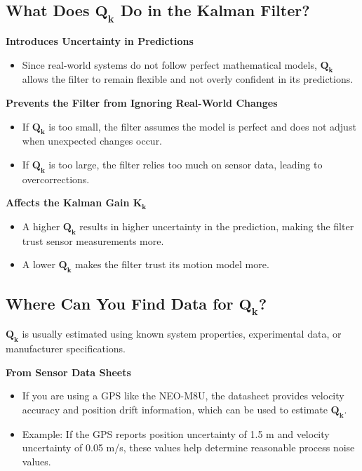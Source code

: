 \documentclass{article}
\begin{document}
\subsection*{What Does \(\mathbf{Q_k}\) Do in the Kalman Filter?}
\textbf{Introduces Uncertainty in Predictions}
\begin{itemize}
    \item Since real-world systems do not follow perfect mathematical models, \(\mathbf{Q_k}\) allows the filter to remain flexible and not overly confident in its predictions.
\end{itemize}

\textbf{Prevents the Filter from Ignoring Real-World Changes}
\begin{itemize}
    \item If \(\mathbf{Q_k}\) is too small, the filter assumes the model is perfect and does not adjust when unexpected changes occur.
    \item If \(\mathbf{Q_k}\) is too large, the filter relies too much on sensor data, leading to overcorrections.
\end{itemize}

\textbf{Affects the Kalman Gain \(\mathbf{K_k}\)}
\begin{itemize}
    \item A higher \(\mathbf{Q_k}\) results in higher uncertainty in the prediction, making the filter trust sensor measurements more.
    \item A lower \(\mathbf{Q_k}\) makes the filter trust its motion model more.
\end{itemize}

\subsection*{Where Can You Find Data for \(\mathbf{Q_k}\)?}
\(\mathbf{Q_k}\) is usually estimated using known system properties, experimental data, or manufacturer specifications.

\textbf{From Sensor Data Sheets}
\begin{itemize}
    \item If you are using a GPS like the NEO-M8U, the datasheet provides velocity accuracy and position drift information, which can be used to estimate \(\mathbf{Q_k}\).
    \item Example: If the GPS reports position uncertainty of 1.5 m and velocity uncertainty of 0.05 m/s, these values help determine reasonable process noise values.
\end{itemize}
\end{document}
